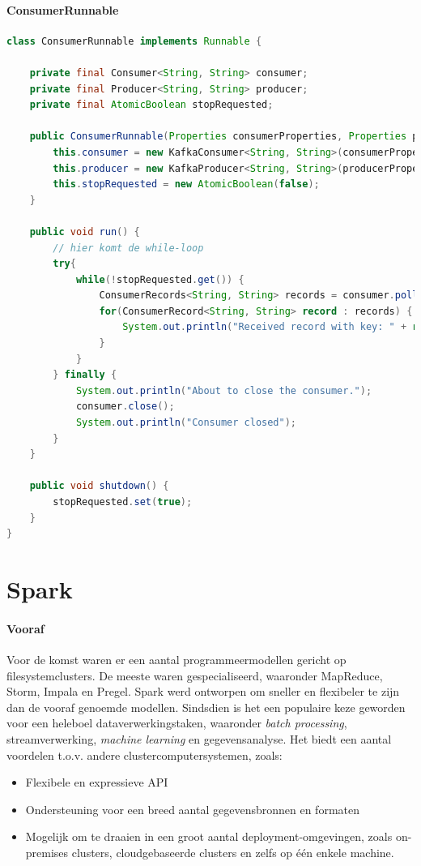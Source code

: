 \documentclass[a4paper,10pt,twoside]{report}
\begin{document}
\subsubsection{ConsumerRunnable}
\begin{lstlisting}[language=Java]
class ConsumerRunnable implements Runnable {
	
	private final Consumer<String, String> consumer;
	private final Producer<String, String> producer;
	private final AtomicBoolean stopRequested;
	
	public ConsumerRunnable(Properties consumerProperties, Properties producerProperties) {
		this.consumer = new KafkaConsumer<String, String>(consumerProperties);
		this.producer = new KafkaProducer<String, String>(producerProperties);
		this.stopRequested = new AtomicBoolean(false);
	}
	
	public void run() {
		// hier komt de while-loop
		try{
			while(!stopRequested.get()) {
				ConsumerRecords<String, String> records = consumer.poll(Duration.ofMillis(500));
				for(ConsumerRecord<String, String> record : records) {
					System.out.println("Received record with key: " + record.key() + "and value" + record.value());
				}
			}
		} finally {
			System.out.println("About to close the consumer.");
			consumer.close();
			System.out.println("Consumer closed");
		}
	}
	
	public void shutdown() {
		stopRequested.set(true);
	}
}
\end{lstlisting}

\chapter{Spark}

\subsubsection{Vooraf}

Voor de komst waren er een aantal programmeermodellen gericht op filesystemclusters. De meeste waren gespecialiseerd, waaronder MapReduce, Storm, Impala en Pregel. Spark werd ontworpen om sneller en flexibeler te zijn dan de vooraf genoemde modellen. Sindsdien is het een populaire keze geworden voor een heleboel dataverwerkingstaken, waaronder \textit{batch processing}, streamverwerking, \textit{machine learning} en gegevensanalyse. Het biedt een aantal voordelen t.o.v. andere clustercomputersystemen, zoals: 

\begin{itemize}
	\item Flexibele en expressieve API
	\item Ondersteuning voor een breed aantal gegevensbronnen en formaten
	\item Mogelijk om te draaien in een groot aantal deployment-omgevingen, zoals on-premises clusters, cloudgebaseerde clusters en zelfs op één enkele machine.
\end{itemize}
\end{document}
